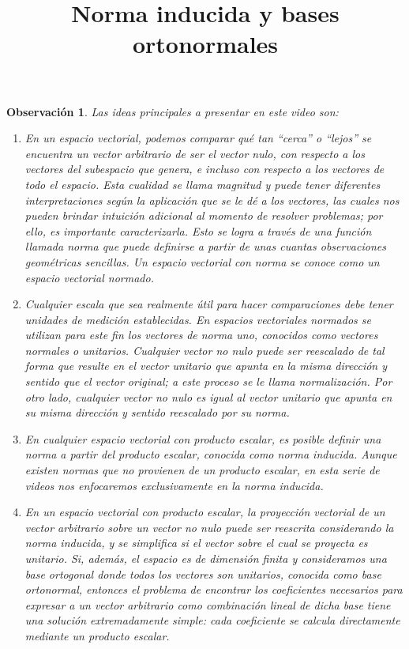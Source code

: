 \documentclass[12pt,dvipsnames]{article}
\newtheorem{obs}{Observación}[section]
\numberwithin{equation}{section}
\begin{document}
\title{Norma inducida y bases ortonormales}
\date{}
\maketitle

\begin{obs}
    Las ideas principales a presentar en este video son:

    \begin{enumerate}[label=(\roman*)]
        \item En un espacio vectorial, podemos comparar qué tan ``cerca'' o ``lejos'' se encuentra un vector arbitrario de ser el vector nulo, con respecto a los vectores del subespacio que genera, e incluso con respecto a los vectores de todo el espacio. Esta cualidad se llama \emph{magnitud} y puede tener diferentes interpretaciones según la aplicación que se le dé a los vectores, las cuales nos pueden brindar intuición adicional al momento de resolver problemas; por ello, es importante caracterizarla. Esto se logra a través de una función llamada \emph{norma} que puede definirse a partir de unas cuantas observaciones geométricas sencillas. Un espacio vectorial con norma se conoce como un espacio vectorial \emph{normado}.

        \item Cualquier escala que sea realmente útil para hacer comparaciones debe tener unidades de medición establecidas. En espacios vectoriales normados se utilizan para este fin los vectores de norma uno, conocidos como vectores \emph{normales} o \emph{unitarios}. Cualquier vector no nulo puede ser reescalado de tal forma que resulte en el vector unitario que apunta en la misma dirección y sentido que el vector original; a este proceso se le llama \emph{normalización}. Por otro lado, cualquier vector no nulo es igual al vector unitario que apunta en su misma dirección y sentido reescalado por su norma.

        \item En cualquier espacio vectorial con producto escalar, es posible definir una norma a partir del producto escalar, conocida como \emph{norma inducida}. Aunque existen normas que no provienen de un producto escalar, en esta serie de videos nos enfocaremos exclusivamente en la norma inducida.

        \item En un espacio vectorial con producto escalar, la proyección vectorial de un vector arbitrario sobre un vector no nulo puede ser reescrita considerando la norma inducida, y se simplifica si el vector sobre el cual se proyecta es unitario. Si, además, el espacio es de dimensión finita y consideramos una base ortogonal donde todos los vectores son unitarios, conocida como base ortonormal, entonces el problema de encontrar los coeficientes necesarios para expresar a un vector arbitrario como combinación lineal de dicha base tiene una solución extremadamente simple: cada coeficiente se calcula directamente mediante un producto escalar.
    \end{enumerate}
\end{obs}
\end{document}
